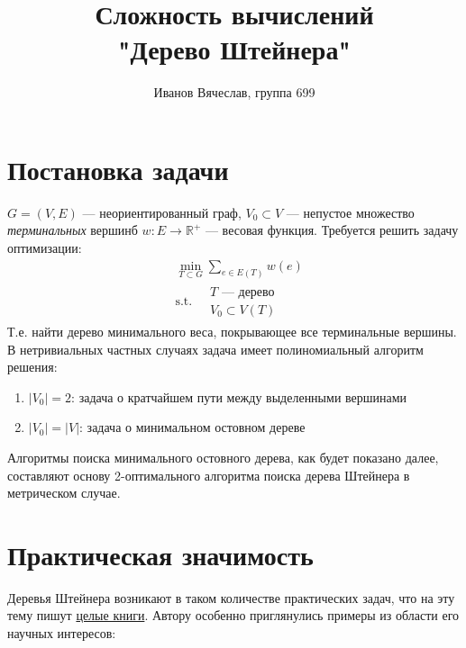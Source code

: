 \documentclass[11pt,a4paper]{report}
\title{Сложность вычислений\\"Дерево Штейнера"}
\author{Иванов Вячеслав, группа 699}
\def\Real{\mathbb{R}}
\theoremstyle{definition}
\theoremstyle{definition}
\theoremstyle{definition}
\begin{document}
	\setlength{\parindent}{1cm}
	{\let\newpage\relax\maketitle}
	\tableofcontents
	\newpage 
	\section{Постановка задачи}
		 $G = (V, E)$ — неориентированный граф, $V_0 \subset V$ — непустое множество \textit{терминальных} вершинб $w : E \to \Real^{+}$ — весовая функция. Требуется решить задачу оптимизации:
		\begin{align*}
			&\min_{T \subset G} \sum_{e \in E(T)} w(e)\\
			&\text{s.t.}\ 
			\begin{aligned}
				&T \text{ — дерево}\\
				&V_0 \subset V(T)			
			\end{aligned}
		\end{align*}
		Т.е. найти дерево минимального веса, покрывающее все терминальные вершины.\\
		В нетривиальных частных случаях задача имеет полиномиальный алгоритм решения:
		\begin{enumerate}
			\item $|V_0| = 2$: задача о кратчайшем пути между выделенными вершинами
			\item $|V_0| = |V|$: задача о минимальном остовном дереве
		\end{enumerate}
		Алгоритмы поиска минимального остовного дерева, как будет показано далее, составляют основу 2-оптимального алгоритма поиска дерева Штейнера в метрическом случае.
	\section{Практическая значимость}
		Деревья Штейнера возникают в таком количестве практических задач, что на эту тему пишут \href{https://www.springer.com/gp/book/9781402000997}{целые книги}. Автору особенно приглянулись примеры из области его научных интересов:
\end{document}
